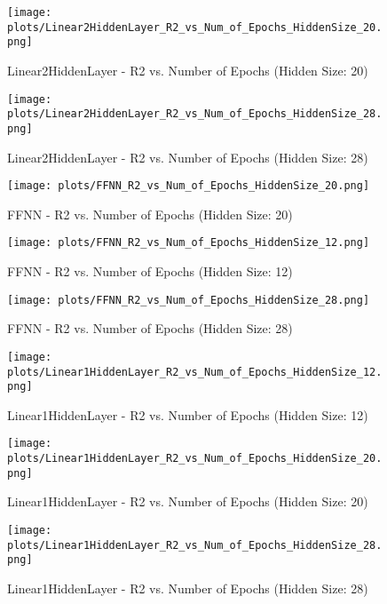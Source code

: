 \begin{figure}[H]
    \centering
    \texttt{[image: plots/Linear2HiddenLayer\_R2\_vs\_Num\_of\_Epochs\_HiddenSize\_20.png]}
    \caption{Linear2HiddenLayer - R2 vs. Number of Epochs (Hidden Size: 20)}
\end{figure}

\begin{figure}[H]
    \centering
    \texttt{[image: plots/Linear2HiddenLayer\_R2\_vs\_Num\_of\_Epochs\_HiddenSize\_28.png]}
    \caption{Linear2HiddenLayer - R2 vs. Number of Epochs (Hidden Size: 28)}
\end{figure}

\begin{figure}[H]
    \centering
    \texttt{[image: plots/FFNN\_R2\_vs\_Num\_of\_Epochs\_HiddenSize\_20.png]}
    \caption{FFNN - R2 vs. Number of Epochs (Hidden Size: 20)}
\end{figure}

\begin{figure}[H]
    \centering
    \texttt{[image: plots/FFNN\_R2\_vs\_Num\_of\_Epochs\_HiddenSize\_12.png]}
    \caption{FFNN - R2 vs. Number of Epochs (Hidden Size: 12)}
\end{figure}

\begin{figure}[H]
    \centering
    \texttt{[image: plots/FFNN\_R2\_vs\_Num\_of\_Epochs\_HiddenSize\_28.png]}
    \caption{FFNN - R2 vs. Number of Epochs (Hidden Size: 28)}
\end{figure}

\begin{figure}[H]
    \centering
    \texttt{[image: plots/Linear1HiddenLayer\_R2\_vs\_Num\_of\_Epochs\_HiddenSize\_12.png]}
    \caption{Linear1HiddenLayer - R2 vs. Number of Epochs (Hidden Size: 12)}
\end{figure}

\begin{figure}[H]
    \centering
    \texttt{[image: plots/Linear1HiddenLayer\_R2\_vs\_Num\_of\_Epochs\_HiddenSize\_20.png]}
    \caption{Linear1HiddenLayer - R2 vs. Number of Epochs (Hidden Size: 20)}
\end{figure}

\begin{figure}[H]
    \centering
    \texttt{[image: plots/Linear1HiddenLayer\_R2\_vs\_Num\_of\_Epochs\_HiddenSize\_28.png]}
    \caption{Linear1HiddenLayer - R2 vs. Number of Epochs (Hidden Size: 28)}
\end{figure}

